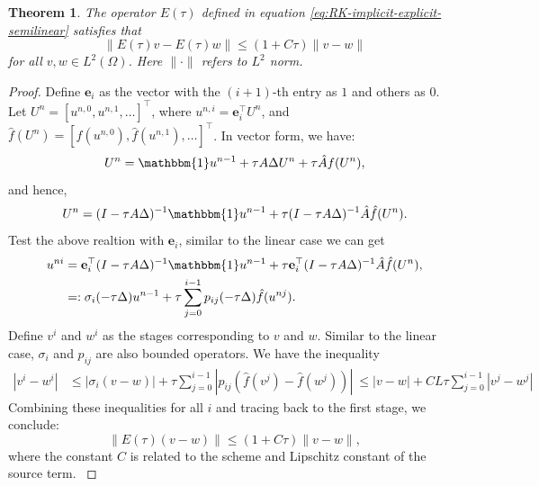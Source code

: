 \documentclass[a4paper, oneside]{book}
\def\bbone{{\mathbbm{1}}}
\def\hatA{{\hat{A}}}
\def\bfe{{\mathbf{e}}}
\def\hatf{{\hat{f}}}
\newtheorem{theorem}{Theorem}[section]
\begin{document}

\begin{theorem}\label{thm:stab-nonlinear}
The operator $E(\tau)$ defined in equation \eqref{eq:RK-implicit-explicit-semilinear} 
satisfies that 
$$\|E(\tau)v - E(\tau)w\| \leq (1+C\tau) \|v-w\|$$
for all $v, w \in L^2(\Omega)$. Here $\|\cdot\|$ refers to $L^2$ norm.  
\end{theorem}

\begin{proof}
Define $\bfe_i$ as the vector with the $(i+1)$-th entry as $1$ and others as $0$. Let $U^n = [u^{n,0}, u^{n,1}, \dots]^\top$, where $u^{n,i} = \bfe_i^\top U^n$, and $\hatf(U^n) = [\hatf(u^{n,0}), \hatf(u^{n,1}), \dots]^\top$. In vector form, we have:
\begin{equation*}\label{eq:RK-implicit-explicit-semilinear-vector}
    U^n = \bbone u^{n-1} + \tau A \Delta U^n + \tau \hatA f(U^n),
\end{equation*}
and hence,
\begin{equation*}
    U^n = (I-\tau A \Delta)^{-1}\bbone u^{n-1} + \tau (I-\tau A \Delta)^{-1} \hatA \hatf(U^n).
\end{equation*}
Test the above realtion with $\bfe_i$, similar to the linear case we can get
\begin{align*}
    u^{ni} & =  \bfe_i^\top(I-\tau A \Delta)^{-1}\bbone u^{n-1} + \tau  \bfe_i^\top(I-\tau A \Delta)^{-1} \hatA \hatf(U^n),\\
        & =:  \sigma_i(-\tau\Delta) u^{n-1} + \tau\sum_{j=0}^{i-1} p_{ij}(-\tau\Delta) \hatf(u^{nj}).     
\end{align*}
Define $v^i$ and $w^i$ as the stages corresponding to $v$ and $w$. {Similar to the linear case, $\sigma_i$ and $p_{ij}$ are also bounded operators.} We have the inequality
\begin{align*}|v^i - w^i| &\leq | \sigma_i(v-w)| + \tau\sum_{j=0}^{i-1} \left|p_{ij} \left(\hatf(v^j)-\hatf(w^j) \right)\right|\
\leq |v-w| + CL \tau\sum_{j=0}^{i-1} \left|v^j-w^j\right|
\end{align*}
Combining these inequalities for all $i$ and tracing back to the first stage, we conclude:
\begin{equation*}
\|E(\tau)(v-w)\| \leq (1+C\tau)\|v-w\|,
\end{equation*}
{where the constant $C$ is related to the scheme and Lipschitz constant of the source term.  }

\end{proof}
\end{document}
